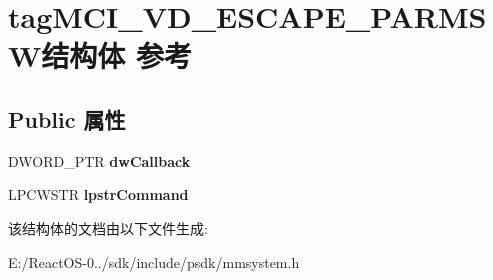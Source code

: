 \hypertarget{structtag_m_c_i___v_d___e_s_c_a_p_e___p_a_r_m_s_w}{}\section{tag\+M\+C\+I\+\_\+\+V\+D\+\_\+\+E\+S\+C\+A\+P\+E\+\_\+\+P\+A\+R\+M\+S\+W结构体 参考}
\label{structtag_m_c_i___v_d___e_s_c_a_p_e___p_a_r_m_s_w}
\subsection*{Public 属性}
\begin{DoxyCompactItemize}
\item 
\mbox{\label{structtag_m_c_i___v_d___e_s_c_a_p_e___p_a_r_m_s_w_a3840ef28d9d4b4b5f2ea6ff31667bf3e}} 
D\+W\+O\+R\+D\+\_\+\+P\+TR {\bfseries dw\+Callback}
\item 
\mbox{\label{structtag_m_c_i___v_d___e_s_c_a_p_e___p_a_r_m_s_w_a694441e37b3dec034d131668a381a8e4}} 
L\+P\+C\+W\+S\+TR {\bfseries lpstr\+Command}
\end{DoxyCompactItemize}


该结构体的文档由以下文件生成\+:\begin{DoxyCompactItemize}
\item 
E\+:/\+React\+O\+S-\/0../sdk/include/psdk/mmsystem.\+h\end{DoxyCompactItemize}
